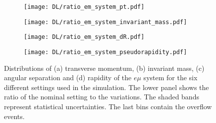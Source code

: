 \begin{figure}[H]
    \centering
    \begin{subfigure}{0.49\textwidth}
        \centering
        \texttt{[image: DL/ratio\_em\_system\_pt.pdf]}
        \caption{}
        \label{app:subfig:pt(em)_DL}
    \end{subfigure}
    \begin{subfigure}{0.49\textwidth}
        \centering
        \texttt{[image: DL/ratio\_em\_system\_invariant\_mass.pdf]}
        \caption{}
        \label{app:subfig:m(em)_DL}
    \end{subfigure}

    \vspace{0.2cm}
    
    \begin{subfigure}{0.49\textwidth}
        \centering
        \texttt{[image: DL/ratio\_em\_system\_dR.pdf]}
        \caption{}
        \label{app:subfig:dR(em)_DL}
    \end{subfigure}
    \begin{subfigure}{0.49\textwidth}
        \centering
        \texttt{[image: DL/ratio\_em\_system\_pseudorapidity.pdf]}
        \caption{}
        \label{app:subfig:eta(em)_DL}
    \end{subfigure}
    \caption{Distributions of (a) transverse momentum, (b) invariant mass,  (c) angular separation and (d) rapidity of the $e\mu$ system for the six different settings used in the simulation. The lower panel shows the ratio of the nominal setting to the variations. The shaded bands represent statistical uncertainties. The last bins contain the overflow events.}
    \label{app:fig:emu_DL}
\end{figure}


